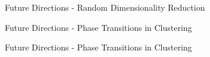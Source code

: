 \documentclass[pdf]{beamer}
\begin{document}
\begin{frame}{Future Directions - Random Dimensionality Reduction}




\end{frame}


\begin{frame}{Future Directions - Phase Transitions in Clustering}




\end{frame}



\begin{frame}{Future Directions - Phase Transitions in Clustering}
\end{frame}
\end{document}
